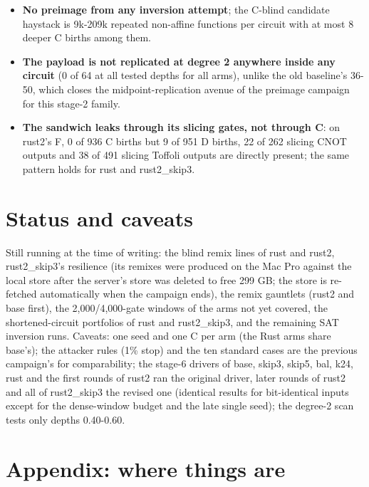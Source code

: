\documentclass[10pt,a4paper]{article}
\begin{document}
\begin{itemize}
\item \textbf{No preimage from any inversion attempt}; the C-blind candidate haystack is 9k-209k repeated non-affine functions per circuit with at most 8 deeper C births among them.
\item \textbf{The payload is not replicated at degree 2 anywhere inside any circuit} (0 of 64 at all tested depths for all arms), unlike the old baseline's 36-50, which closes the midpoint-replication avenue of the preimage campaign for this stage-2 family.
\item \textbf{The sandwich leaks through its slicing gates, not through C}: on rust2's F, 0 of 936 C births but 9 of 951 D births, 22 of 262 slicing CNOT outputs and 38 of 491 slicing Toffoli outputs are directly present; the same pattern holds for rust and rust2\_skip3.
\end{itemize}

\section{Status and caveats}

Still running at the time of writing: the blind remix lines of rust and rust2, rust2\_skip3's resilience (its remixes were produced on the Mac Pro against the local store after the server's store was deleted to free 299 GB; the store is re-fetched automatically when the campaign ends), the remix gauntlets (rust2 and base first), the 2,000/\allowbreak{}4,000-gate windows of the arms not yet covered, the shortened-circuit portfolios of rust and rust2\_skip3, and the remaining SAT inversion runs. Caveats: one seed and one C per arm (the Rust arms share base's); the attacker rules (1\% stop) and the ten standard cases are the previous campaign's for comparability; the stage-6 drivers of base, skip3, skip5, bal, k24, rust and the first rounds of rust2 ran the original driver, later rounds of rust2 and all of rust2\_skip3 the revised one (identical results for bit-identical inputs except for the dense-window budget and the late single seed); the degree-2 scan tests only depths 0.40-0.60.

\section{Appendix: where things are}
\end{document}
